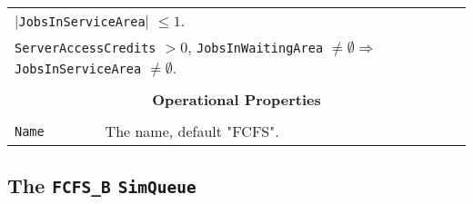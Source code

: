 \documentclass[12pt]{book}
\begin{document}
\begin{tabular}{|l|l|l|l|}
\multicolumn{4}{|l|}{$|$\lstinline|JobsInServiceArea|$|$ $\leq 1$.} \\
\multicolumn{4}{|l|}{\lstinline|ServerAccessCredits| $> 0$, \lstinline|JobsInWaitingArea| $\neq \emptyset
                     \Rightarrow$ \lstinline|JobsInServiceArea| $\neq \emptyset$.} \\
\hline
\multicolumn{4}{|c|}{} \\
\multicolumn{4}{|c|}{\bf Operational Properties} \\
\multicolumn{4}{|c|}{} \\
\hline
\lstinline|Name| & \multicolumn{3}{|l|}{The name, default "FCFS".} \\
\hline
\end{tabular}

\subsection{The \lstinline{FCFS_B} \lstinline{SimQueue}}
\label{FCFS_B}
\end{document}
